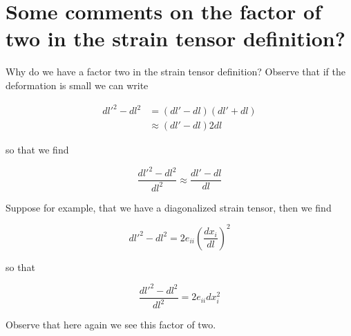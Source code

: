 \label{chap:continuumL3}

\section{Some comments on the factor of two in the strain tensor definition?}

%
%
%
%
Why do we have a factor two in the strain tensor definition?  Observe that if the deformation is small we can write

\begin{align*}
{dl'}^2 - dl^2 
&= (dl' - dl)(dl' + dl) \\
&\approx
 (dl' - dl) 2 dl
\end{align*}

so that we find 

\begin{equation}\label{eqn:continuumL3:50}
\frac{{dl'}^2 - dl^2 }{dl^2}
\approx
\frac{dl' - dl }{dl}
\end{equation}

Suppose for example, that we have a diagonalized strain tensor, then we find

\begin{equation}\label{eqn:continuumL3:70}
{dl'}^2 - dl^2 
= 2 e_{ii} \left(\frac{dx_i}{dl}\right)^2
\end{equation}

so that

\begin{equation}\label{eqn:continuumL3:90}
\frac{
{dl'}^2 - dl^2 
}{dl^2}
= 2 e_{ii} dx_i^2
\end{equation}

Observe that here again we see this factor of two.

